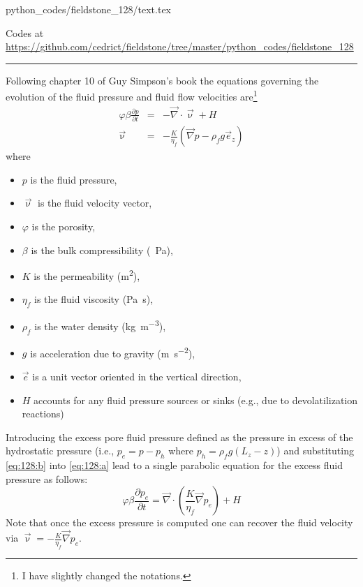 \begin{flushright} {\tiny {\color{gray} python\_codes/fieldstone\_128/text.tex}} \end{flushright}



\begin{center}
Codes at \url{https://github.com/cedrict/fieldstone/tree/master/python_codes/fieldstone_128}
\end{center}

\par\noindent\rule{\textwidth}{0.4pt}


Following chapter 10 of Guy Simpson's book \cite{simp17} the equations
governing the evolution of the fluid pressure and fluid flow velocities are\footnote{I have slightly changed the notations.}
\begin{eqnarray}
\varphi \beta \frac{\partial p}{\partial t} &=& -\vec\nabla \cdot \vec \upnu + H \label{eq:128:a}\\
\vec\upnu &=& -\frac{K}{\eta_f} \left(\vec\nabla p - \rho_f g \vec{e}_z \right) \label{eq:128:b}
\end{eqnarray}
where
\begin{itemize}
\item $p$ is the fluid pressure, 
\item $\vec\upnu$ is the fluid velocity vector, 
\item $\varphi$ is the porosity, 
\item $\beta$ is the bulk compressibility (\si{\per\pascal}), 
\item $K$ is the permeability (\si{\square\meter}), 
\item $\eta_f$ is the fluid viscosity (\si{\pascal\second}), 
\item $\rho_f$ is the water density (\si{\kg\per\cubic\meter}), 
\item $g$ is acceleration due to gravity (\si{\meter\per\square\second}), 
\item $\vec{e}$ is a unit vector oriented in the vertical direction, 
\item $H$ accounts for any fluid pressure sources or sinks (e.g., due to devolatilization reactions)
\end{itemize}
Introducing the excess pore fluid pressure defined as the pressure in excess of the hydrostatic pressure 
(i.e., $p_e = p-p_h$ where $p_h = \rho_f g (L_z-z)$) and 
substituting \eqref{eq:128:b} into \eqref{eq:128:a} lead to a single parabolic equation for
the excess fluid pressure as follows:
\begin{equation}
\varphi \beta  \frac{\partial p_e}{\partial t}
=
\vec\nabla \cdot \left( \frac{K}{\eta_f} \vec\nabla p_e  \right) + H
\end{equation}
Note that once the excess pressure is computed one can recover the fluid velocity via $\vec\upnu=-\frac{K}{\eta_f} \vec\nabla p_e$. 

